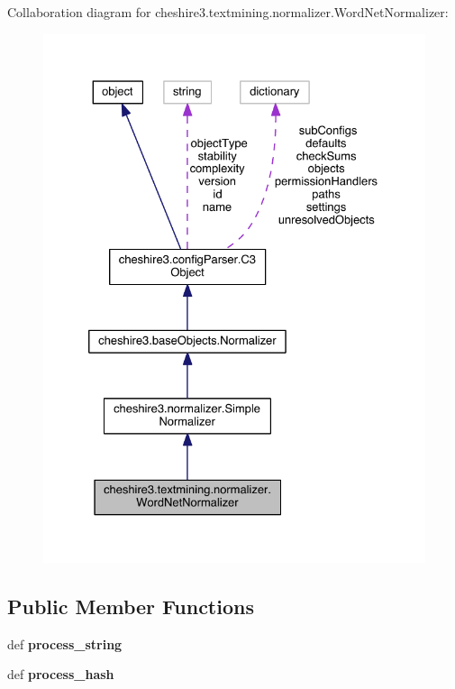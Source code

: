 Collaboration diagram for cheshire3.\-textmining.\-normalizer.\-Word\-Net\-Normalizer\-:
\nopagebreak
\begin{figure}[H]
\begin{center}
\leavevmode
\includegraphics[width=328pt]{classcheshire3_1_1textmining_1_1normalizer_1_1_word_net_normalizer__coll__graph}
\end{center}
\end{figure}
\subsection*{Public Member Functions}
\begin{DoxyCompactItemize}
\item 
\hypertarget{classcheshire3_1_1textmining_1_1normalizer_1_1_word_net_normalizer_a99aa014f8eb78ff5043c6db7bb10d983}{def {\bfseries process\-\_\-string}}\label{classcheshire3_1_1textmining_1_1normalizer_1_1_word_net_normalizer_a99aa014f8eb78ff5043c6db7bb10d983}

\item 
\hypertarget{classcheshire3_1_1textmining_1_1normalizer_1_1_word_net_normalizer_a56f29458dc34fcfc27b92136dd9f6abe}{def {\bfseries process\-\_\-hash}}\label{classcheshire3_1_1textmining_1_1normalizer_1_1_word_net_normalizer_a56f29458dc34fcfc27b92136dd9f6abe}

\end{DoxyCompactItemize}
